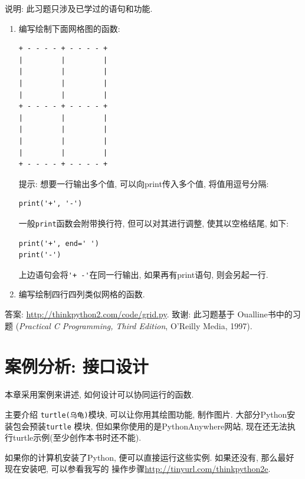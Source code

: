 \documentclass[10pt]{book}
\begin{document}
\begin{exercise}

说明: 此习题只涉及已学过的语句和功能. 

\begin{enumerate}

\item 编写绘制下面网格图的函数:

\begin{verbatim}
+ - - - - + - - - - +
|         |         |
|         |         |
|         |         |
|         |         |
+ - - - - + - - - - +
|         |         |
|         |         |
|         |         |
|         |         |
+ - - - - + - - - - +
\end{verbatim}
%
提示: 想要一行输出多个值, 可以向print传入多个值, 将值用逗号分隔:

\begin{verbatim}
print('+', '-')
\end{verbatim}
%
一般{\tt print}函数会附带换行符, 但可以对其进行调整, 
使其以空格结尾, 如下:

\begin{verbatim}
print('+', end=' ')
print('-')
\end{verbatim}
%
上边语句会将\verb"'+ -'"在同一行输出, 如果再有print语句, 则会另起一行. 

\item 编写绘制四行四列类似网格的函数. 

\end{enumerate}

答案: \url{http://thinkpython2.com/code/grid.py}.
致谢: 此习题基于 Oualline书中的习题
({\em Practical C Programming, Third Edition},  
O'Reilly Media, 1997).

\end{exercise}


\chapter{案例分析: 接口设计}
\label{turtlechap}

本章采用案例来讲述, 如何设计可以协同运行的函数. 

主要介绍 {\tt turtle(乌龟)}模块, 可以让你用其绘图功能, 制作图片. 
大部分Python安装包会预装{\tt turtle} 模块, 但如果你使用的是PythonAnywhere网站, 
现在还无法执行turtle示例(至少创作本书时还不能). 

如果你的计算机安装了Python,  便可以直接运行这些实例. 
如果还没有, 那么最好现在安装吧, 可以参看我写的
操作步骤\url{http://tinyurl.com/thinkpython2e}. 
\end{document}
